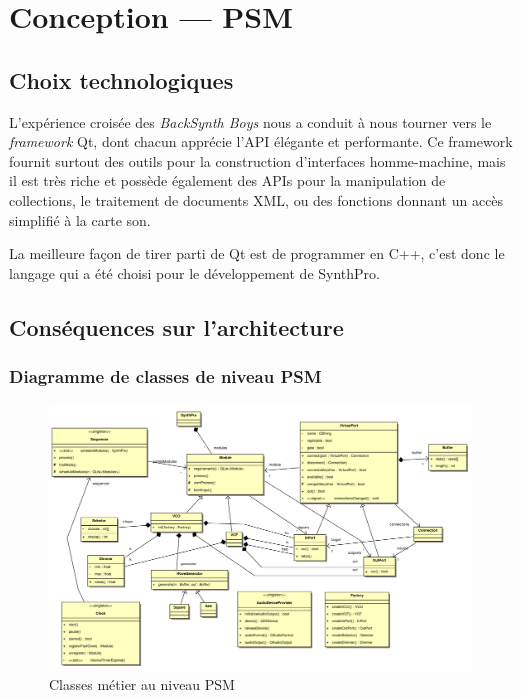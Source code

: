 \section{Conception — PSM}

\subsection{Choix technologiques}

L'expérience croisée des \emph{BackSynth Boys} nous a conduit à
nous tourner vers le \emph{framework} Qt, dont chacun apprécie
l'API élégante et performante. Ce framework fournit surtout des
outils pour la construction d'interfaces homme-machine, mais il est
très riche et possède également des APIs pour la manipulation de
collections, le traitement de documents XML, ou des fonctions
donnant un accès simplifié à la carte son.

La meilleure façon de tirer parti de Qt est de programmer en C++,
c'est donc le langage qui a été choisi pour le développement de
SynthPro.

\subsection{Conséquences sur l'architecture}

\subsubsection{Diagramme de classes de niveau PSM}

\begin{figure}[p]
\centering
\includegraphics[width=23cm,angle=90]{../img/ps/business-psm.pdf}
\caption{Classes métier au niveau PSM}
\label{psm-class}
\end{figure}

